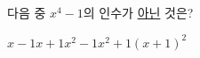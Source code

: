 다음 중 $x^4-1$의 인수가 \underline{아닌} 것은?
\begin{choices32}{$x-1$}{$x+1$}{$x^2-1$}{$x^2+1$}{$(x+1)^2$}\end{choices32}
